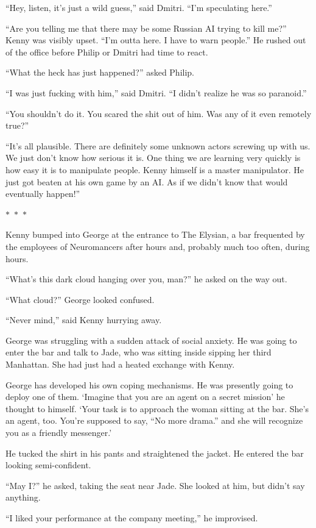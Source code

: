 \documentclass{memoir}
\newcommand{\starbreak}{%
\begin{center}
  $\ast$~$\ast$~$\ast$
\end{center}
}
\begin{document}
``Hey, listen, it's just a wild guess,'' said Dmitri. ``I'm speculating here.''

``Are you telling me that there may be some Russian AI trying to kill me?'' Kenny was visibly upset. ``I'm outta here. I have to warn people.'' He rushed out of the office before Philip or Dmitri had time to react.

``What the heck has just happened?'' asked Philip. 

``I was just fucking with him,'' said Dmitri. ``I didn't realize he was so paranoid.''

``You shouldn't do it. You scared the shit out of him. Was any of it even remotely true?''

``It's all plausible. There are definitely some unknown actors screwing up with us. We just don't know how serious it is. One thing we are learning very quickly is how easy it is to manipulate people. Kenny himself is a master manipulator. He just got beaten at his own game by an AI. As if we didn't know that would eventually happen!''

\starbreak

Kenny bumped into George at the entrance to The Elysian, a bar frequented by the employees of Neuromancers after hours and, probably much too often, during hours.

``What's this dark cloud hanging over you, man?'' he asked on the way out.

``What cloud?'' George looked confused.

``Never mind,'' said Kenny hurrying away.

George was struggling with a sudden attack of social anxiety. He was going to enter the bar and talk to Jade, who was sitting inside sipping her third Manhattan. She had just had a heated exchange with Kenny. 

George has developed his own coping mechanisms. He was presently going to deploy one of them. `Imagine that you are an agent on a secret mission' he thought to himself. `Your task is to approach the woman sitting at the bar. She's an agent, too. You're supposed to say, ``No more drama.'' and she will recognize you as a friendly messenger.'

He tucked the shirt in his pants and straightened the jacket. He entered the bar looking semi-confident. 

``May I?'' he asked, taking the seat near Jade. She looked at him, but didn't say anything.

``I liked your performance at the company meeting,'' he improvised.
\end{document}
